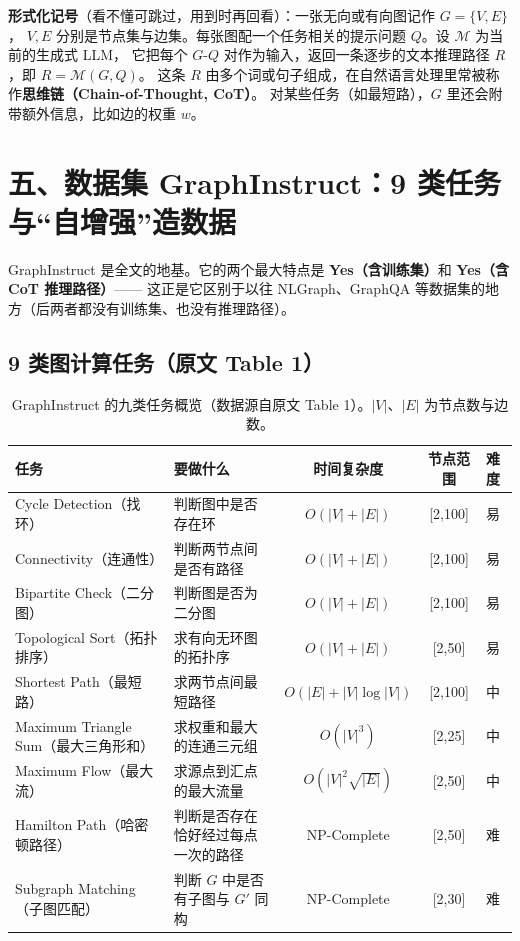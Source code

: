 \documentclass[11pt,UTF8,fontset=fandol]{ctexart}
\begin{document}
\textbf{形式化记号}（看不懂可跳过，用到时再回看）：一张无向或有向图记作 $G=\{V,E\}$，
$V,E$ 分别是节点集与边集。每张图配一个任务相关的提示问题 $Q$。设 $\mathcal{M}$ 为当前的生成式 LLM，
它把每个 $G$-$Q$ 对作为输入，返回一条逐步的文本推理路径 $R$，即 $R=\mathcal{M}(G,Q)$。
这条 $R$ 由多个词或句子组成，在自然语言处理里常被称作\textbf{思维链（Chain-of-Thought, CoT）}。
对某些任务（如最短路），$G$ 里还会附带额外信息，比如边的权重 $w$。

\section{五、数据集 GraphInstruct：9 类任务与“自增强”造数据}

GraphInstruct 是全文的地基。它的两个最大特点是 \textbf{Yes（含训练集）}和 \textbf{Yes（含 CoT 推理路径）}——
这正是它区别于以往 NLGraph、GraphQA 等数据集的地方（后两者都没有训练集、也没有推理路径）。

\subsection{9 类图计算任务（原文 Table 1）}

\begin{table}[H]\centering
\caption{GraphInstruct 的九类任务概览（数据源自原文 Table 1）。$|V|$、$|E|$ 为节点数与边数。}
\begin{tabular}{llccl}
\toprule
\textbf{任务} & \textbf{要做什么} & \textbf{时间复杂度} & \textbf{节点范围} & \textbf{难度} \\
\midrule
Cycle Detection（找环）   & 判断图中是否存在环 & $O(|V|+|E|)$ & [2,100] & 易 \\
Connectivity（连通性）    & 判断两节点间是否有路径 & $O(|V|+|E|)$ & [2,100] & 易 \\
Bipartite Check（二分图） & 判断图是否为二分图 & $O(|V|+|E|)$ & [2,100] & 易 \\
Topological Sort（拓扑排序） & 求有向无环图的拓扑序 & $O(|V|+|E|)$ & [2,50] & 易 \\
Shortest Path（最短路）   & 求两节点间最短路径 & $O(|E|+|V|\log|V|)$ & [2,100] & 中 \\
Maximum Triangle Sum（最大三角形和） & 求权重和最大的连通三元组 & $O(|V|^3)$ & [2,25] & 中 \\
Maximum Flow（最大流）    & 求源点到汇点的最大流量 & $O(|V|^2\sqrt{|E|})$ & [2,50] & 中 \\
Hamilton Path（哈密顿路径） & 判断是否存在恰好经过每点一次的路径 & NP-Complete & [2,50] & 难 \\
Subgraph Matching（子图匹配） & 判断 $G$ 中是否有子图与 $G'$ 同构 & NP-Complete & [2,30] & 难 \\
\bottomrule
\end{tabular}
\end{table}
\end{document}
